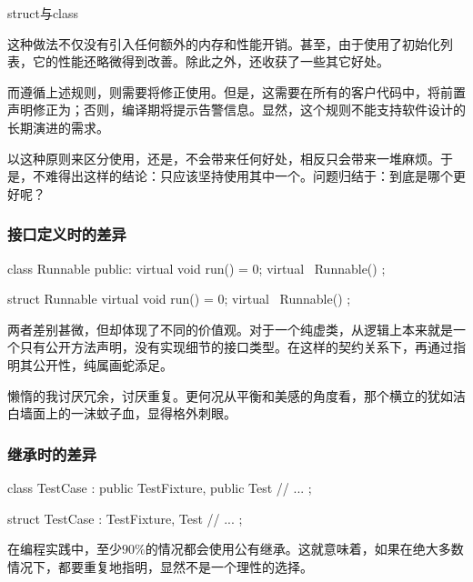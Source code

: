 \begin{content}
\begin{episode}{struct与class}
\begin{content}
这种做法不仅没有引入任何额外的内存和性能开销。甚至，由于使用了初始化列表，它的性能还略微得到改善。除此之外，还收获了一些其它好处。

\begin{enum}
\end{enum}

而遵循上述规则，则需要将修正使用。但是，这需要在所有的客户代码中，将前置声明修正为；否则，编译期将提示告警信息。显然，这个规则不能支持软件设计的长期演进的需求。

以这种原则来区分使用，还是，不会带来任何好处，相反只会带来一堆麻烦。于是，不难得出这样的结论：只应该坚持使用其中一个。问题归结于：到底是哪个更好呢？

\subsubsection{接口定义时的差异}

\begin{c++}
class Runnable {
public:
  virtual void run() = 0;
  virtual ~Runnable() {}
};

struct Runnable {
  virtual void run() = 0;
  virtual ~Runnable() {}
};
\end{c++}

两者差别甚微，但却体现了不同的价值观。对于一个纯虚类，从逻辑上本来就是一个只有公开方法声明，没有实现细节的接口类型。在这样的契约关系下，再通过指明其公开性，纯属画蛇添足。

懒惰的我讨厌冗余，讨厌重复。更何况从平衡和美感的角度看，那个横立的犹如洁白墙面上的一沫蚊子血，显得格外刺眼。

\subsubsection{继承时的差异}

\begin{c++}
class TestCase : public TestFixture, public Test {
  // ...
};

struct TestCase : TestFixture, Test {
  // ...  
};
\end{c++}

在编程实践中，至少$90\%$的情况都会使用公有继承。这就意味着，如果在绝大多数情况下，都要重复地指明，显然不是一个理性的选择。


\end{content}
\end{episode}
\end{content}
